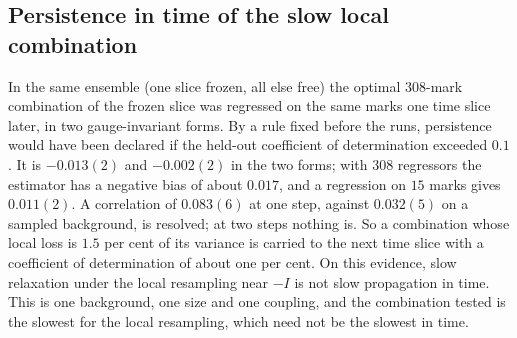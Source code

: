 \subsection{Persistence in time of the slow local combination}\label{s:time}
In the same ensemble (one slice frozen, all else free) the optimal $308$-mark combination of the frozen slice
was regressed on the same marks one time slice later, in two gauge-invariant forms. By a rule fixed before the
runs, persistence would have been declared if the held-out coefficient of determination exceeded $0.1$. It is
$-0.013(2)$ and $-0.002(2)$ in the two forms; with $308$ regressors the estimator has a negative bias of about
$0.017$, and a regression on $15$ marks gives $0.011(2)$. A correlation of $0.083(6)$ at one step, against
$0.032(5)$ on a sampled background, is resolved; at two steps nothing is. So a combination whose local loss is
$1.5$ per cent of its variance is carried to the next time slice with a coefficient of determination of about
one per cent. On this evidence, slow relaxation under the local resampling near $-I$ is not slow propagation in
time. This is one background, one size and one coupling, and the combination tested is the slowest for the
local resampling, which need not be the slowest in time.

